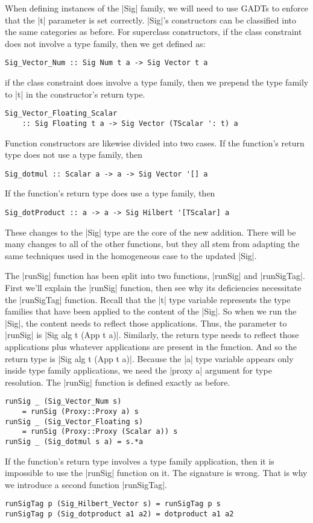 \documentclass[preprint]{sigplanconf}
\theoremstyle{definition}
\begin{document}
When defining instances of the |Sig| family, we will need to use GADTs to enforce that the |t| parameter is set correctly.
|Sig|'s constructors can be classified into the same categories as before.
For superclass constructors, if the class constraint does not involve a type family,
then we get defined as:
\begin{lstlisting}
Sig_Vector_Num :: Sig Num t a -> Sig Vector t a
\end{lstlisting}
if the class constraint does involve a type family,
then we prepend the type family to |t| in the constructor's return type.
\begin{lstlisting}
Sig_Vector_Floating_Scalar
    :: Sig Floating t a -> Sig Vector (TScalar ': t) a
\end{lstlisting}
Function constructors are likewise divided into two cases.
If the function's return type does not use a type family,
then
\begin{lstlisting}
Sig_dotmul :: Scalar a -> a -> Sig Vector '[] a
\end{lstlisting}
If the function's return type does use a type family,
then
\begin{lstlisting}
Sig_dotProduct :: a -> a -> Sig Hilbert '[TScalar] a
\end{lstlisting}
These changes to the |Sig| type are the core of the new addition.
There will be many changes to all of the other functions,
but they all stem from adapting the same techniques used in the homogeneous case to the updated |Sig|.

The |runSig| function has been split into two functions, |runSig| and |runSigTag|.
First we'll explain the |runSig| function, then see why its deficiencies necessitate the |runSigTag| function.
Recall that the |t| type variable represents the type families that have been applied to the content of the |Sig|.
So when we run the |Sig|, the content needs to reflect those applications.
Thus, the parameter to |runSig| is |Sig alg t (App t a)|.
Similarly, the return type needs to reflect those applications plus whatever applications are present in the function.
And so the return type is |Sig alg t (App t a)|.
Because the |a| type variable appears only inside type family applications,
we need the |proxy a| argument for type resolution.
The |runSig| function is defined exactly as before.
\begin{lstlisting}
runSig _ (Sig_Vector_Num s)
    = runSig (Proxy::Proxy a) s
runSig _ (Sig_Vector_Floating s)
    = runSig (Proxy::Proxy (Scalar a)) s
runSig _ (Sig_dotmul s a) = s.*a
\end{lstlisting}
If the function's return type involves a type family application,
then it is impossible to use the |runSig| function on it.
The signature is wrong.
That is why we introduce a second function |runSigTag|.
\begin{lstlisting}
runSigTag p (Sig_Hilbert_Vector s) = runSigTag p s
runSigTag p (Sig_dotproduct a1 a2) = dotproduct a1 a2
\end{lstlisting}
\end{document}
